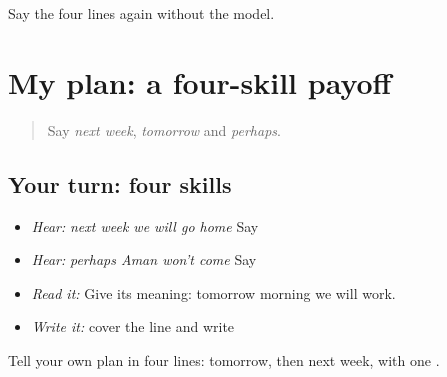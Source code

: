 \begin{tcolorbox}[breakable,colback=teal!4,colframe=teal!35!black,title={Before you move on}]
Say the four lines again without the model.
\end{tcolorbox}
\section[\texorpdfstring{\pa{ਸ਼ਾਇਦ} \pa{ਅਸੀਂ} \pa{ਅਗਲੇ} \pa{ਹਫ਼ਤੇ} … (shāid asīṁ agle …)}{ਸ਼ਾਇਦ ਅਸੀਂ ਅਗਲੇ ਹਫ਼ਤੇ … (shāid asīṁ agle …)}]{My plan: a four-skill payoff}

\label{lesson:PA-C223-payoff}



\begin{quote}
Say \emph{next week}, \emph{tomorrow} and \emph{perhaps}.
\end{quote}

\subsection*{Your turn: four skills}
\begin{itemize}
\raggedright
  \item \emph{Hear:} \emph{next week we will go home} Say \textbf{    }
  \item \emph{Hear:} \emph{perhaps Aman won't come} Say \textbf{   }
  \item \emph{Read it:} \textbf{    } Give its meaning: tomorrow morning we will work.
  \item \emph{Write it:} cover the line and write \textbf{    }
\end{itemize}

\begin{tcolorbox}[breakable,colback=teal!4,colframe=teal!35!black,title={Before you move on}]
Tell your own plan in four lines: tomorrow, then next week, with one \textbf{}.
\end{tcolorbox}
